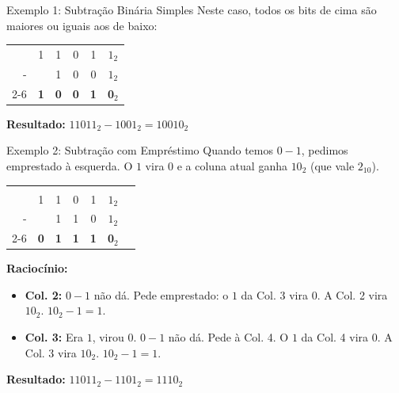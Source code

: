 \begin{frame}{Exemplo 1: Subtração Binária Simples}
    Neste caso, todos os bits de cima são maiores ou iguais aos de baixo:

    \vspace{0.8cm}
    \centering
    \Large
    \begin{tabular}{r ccccc}
          & 1          & 1          & 0          & 1          & $1_2$          \\
        - &            & 1          & 0          & 0          & $1_2$          \\ \cline{2-6}
          & \textbf{1} & \textbf{0} & \textbf{0} & \textbf{1} & \textbf{0$_2$} \\
    \end{tabular}

    \vspace{0.8cm}
    \flushleft
    \normalsize
    \textbf{Resultado:} $11011_2 - 1001_2 = 10010_2$
\end{frame}

\begin{frame}{Exemplo 2: Subtração com Empréstimo}
    Quando temos $0 - 1$, pedimos emprestado à esquerda. O $1$ vira $0$ e a coluna atual ganha $10_2$ (que vale $2_{10}$).

    \vspace{0.5cm}
    \centering
    \Large
    \begin{tabular}{r cccccl}
        \color{red}{\footnotesize (emprestado)} & \color{red}{-1} & \color{red}{-1} & \color{red}{+10} &            &                & \\
                                                & 1               & 1               & 0                & 1          & $1_2$          & \\
        -                                       &                 & 1               & 1                & 0          & $1_2$          & \\ \cline{2-6}
                                                & \textbf{0}      & \textbf{1}      & \textbf{1}       & \textbf{1} & \textbf{0$_2$} & \\
    \end{tabular}

    \vspace{0.5cm}
    \flushleft
    \small
    \textbf{Raciocínio:}
    \begin{itemize}
        \item \textbf{Col. 2:} $0 - 1$ não dá. Pede emprestado: o $1$ da Col. 3 vira $0$. A Col. 2 vira $10_2$. $10_2 - 1 = 1$.
        \item \textbf{Col. 3:} Era $1$, virou $0$. $0 - 1$ não dá. Pede à Col. 4. O $1$ da Col. 4 vira $0$. A Col. 3 vira $10_2$. $10_2 - 1 = 1$.
    \end{itemize}
    \normalsize
    \textbf{Resultado:} $11011_2 - 1101_2 = 1110_2$
\end{frame}

